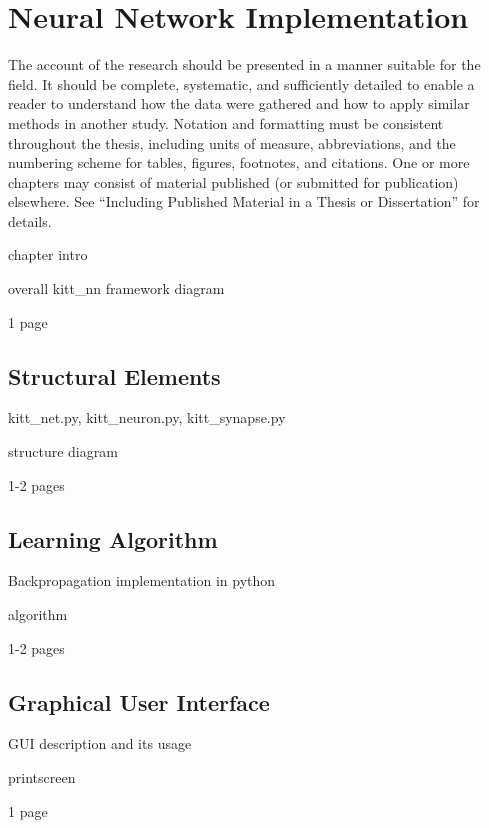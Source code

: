 \chapter{Neural Network Implementation}
\label{chapter:04:neural_net_implementation}

The account of the research should be presented in a manner suitable for the field. It should be complete, systematic, and sufficiently detailed to enable a reader to understand how the data were gathered and how to apply similar methods in another study. Notation and formatting must be consistent throughout the thesis, including units of measure, abbreviations, and the numbering scheme for tables, figures, footnotes, and citations. One or more chapters may consist of material published (or submitted for publication) elsewhere. See “Including Published Material in a Thesis or Dissertation” for details.

chapter intro

overall kitt\_nn framework diagram

1 page

\section{Structural Elements}
kitt\_net.py, kitt\_neuron.py, kitt\_synapse.py

structure diagram

1-2 pages

\section{Learning Algorithm}
Backpropagation implementation in python

algorithm

1-2 pages

\section{Graphical User Interface}
GUI description and its usage

printscreen

1 page
